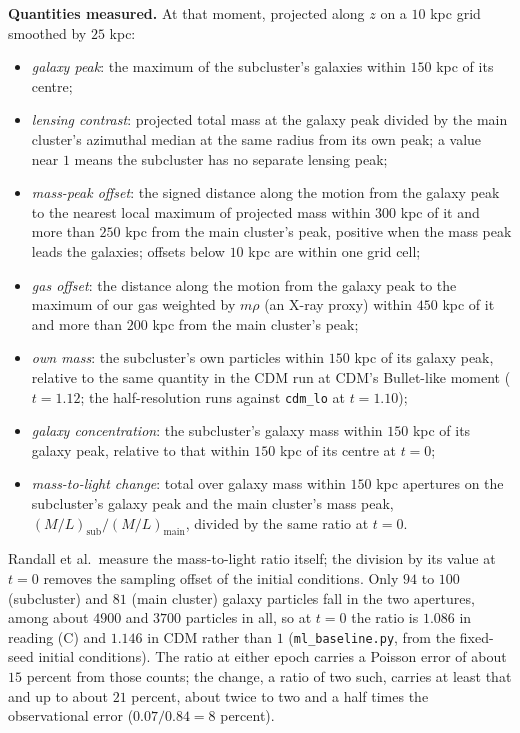 \documentclass[11pt]{article}
\theoremstyle{definition}
\theoremstyle{plain}
\providecommand{\file}{}\renewcommand{\file}[1]{\texttt{#1}}
\begin{document}
\label{c:note.simulations.setting-measurements-3}
\textbf{Quantities measured.} At that moment, projected along $z$ on a $10$ kpc grid smoothed by $25$ kpc:
\begin{itemize}
\item \emph{galaxy peak}: the maximum of the subcluster's galaxies within $150$ kpc of its centre;
\item \emph{lensing contrast}: projected total mass at the galaxy peak divided by the main cluster's azimuthal median at the same radius from its own peak; a value near $1$ means the subcluster has no separate lensing peak;
\item \emph{mass-peak offset}: the signed distance along the motion from the galaxy peak to the nearest local maximum of projected mass within $300$ kpc of it and more than $250$ kpc from the main cluster's peak, positive when the mass peak leads the galaxies; offsets below $10$ kpc are within one grid cell;
\item \emph{gas offset}: the distance along the motion from the galaxy peak to the maximum of our gas weighted by $m\rho$ (an X-ray proxy) within $450$ kpc of it and more than $200$ kpc from the main cluster's peak;
\item \emph{own mass}: the subcluster's own particles within $150$ kpc of its galaxy peak, relative to the same quantity in the CDM run at CDM's Bullet-like moment ($t = 1.12$; the half-resolution runs against \texttt{cdm\_lo} at $t = 1.10$);
\item \emph{galaxy concentration}: the subcluster's galaxy mass within $150$ kpc of its galaxy peak, relative to that within $150$ kpc of its centre at $t = 0$;
\item \emph{mass-to-light change}: total over galaxy mass within $150$ kpc apertures on the subcluster's galaxy peak and the main cluster's mass peak, $(M/L)_{\mathrm{sub}}/(M/L)_{\mathrm{main}}$, divided by the same ratio at $t = 0$.
\end{itemize}
Randall et al.\ measure the mass-to-light ratio itself; the division by its value at $t = 0$ removes the sampling offset of the initial conditions. Only $94$ to $100$ (subcluster) and $81$ (main cluster) galaxy particles fall in the two apertures, among about $4900$ and $3700$ particles in all, so at $t = 0$ the ratio is $1.086$ in reading (C) and $1.146$ in CDM rather than $1$ (\file{ml\_baseline.py}, from the fixed-seed initial conditions). The ratio at either epoch carries a Poisson error of about $15$ percent from those counts; the change, a ratio of two such, carries at least that and up to about $21$ percent, about twice to two and a half times the observational error ($0.07/0.84 = 8$ percent).
\end{document}
